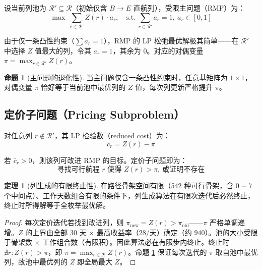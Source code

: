 \documentclass[12pt,a4paper]{ctexart}
\theoremstyle{definition}
\newtheorem{theorem}{定理}[section]
\newtheorem{proposition}{命题}[section]
\begin{document}
设当前列池为 $\mathcal{R}'\subseteq\mathcal{R}$（初始仅含 $B\to E$ 直航列），受限主问题（RMP）为：
\begin{equation}\label{eq:rmp}
  \max\ \sum_{r\in\mathcal{R}'} Z(r)\cdot a_r,\quad \text{s.t.}\ \sum_{r\in\mathcal{R}'} a_r = 1,\ a_r\in[0,1]
\end{equation}

由于仅一条凸性约束（$\sum a_r=1$），RMP 的 LP 松弛最优解极其简单——在 $\mathcal{R}'$ 中选择 $Z$ 值最大的列，令其 $a_r=1$，其余为 0。对应的对偶变量 $\pi = \max_{r\in\mathcal{R}'} Z(r)$。

\begin{proposition}[主问题的退化性]\label{prop:degenerate}
  当主问题仅含一条凸性约束时，任意基矩阵为 $1\times 1$，对偶变量 $\pi$ 恰好等于当前池中最优列的 $Z$ 值，每次列更新严格提升 $\pi$。
\end{proposition}

\subsection{定价子问题（Pricing Subproblem）}

对任意列 $r\notin\mathcal{R}'$，其 LP 检验数（reduced cost）为：
\begin{equation}
  \bar{c}_r = Z(r) - \pi
\end{equation}

若 $\bar{c}_r > 0$，则该列可改进 RMP 的目标。定价子问题即为：
\begin{equation}\label{eq:pricing}
  \text{寻找可行航程 } r \text{ 使得 } Z(r) > \pi,\ \text{或证明不存在}
\end{equation}

\begin{theorem}[列生成的有限终止性]\label{thm:cg-conv}
  在路径骨架空间有限（542 种可行骨架，含 $0\sim 7$ 个中间点）、工作天数组合有限的条件下，列生成算法在有限次迭代后必然终止，终止时所得解等于全枚举最优解。
\end{theorem}

\begin{proof}
  每次定价迭代若找到改进列，则 $\pi_{\text{new}} = Z(r) > \pi_{\text{old}}$——$\pi$ 严格单调递增。$Z$ 的上界由全部 30 天 $\times$ 最高收益率（$28$/天）确定（约 $940$）。池的大小受限于骨架数 $\times$ 工作组合数（有限积）。因此算法必在有限步内终止。终止时 $\nexists r: Z(r) > \pi$，即 $\pi = \max_{r\in\mathcal{R}} Z(r)$。命题 \ref{prop:degenerate} 保证每次迭代的 $\pi$ 取自池中最优列，故池中最优列的 $Z$ 即全局最大 $Z$。\end{proof}
\end{document}
